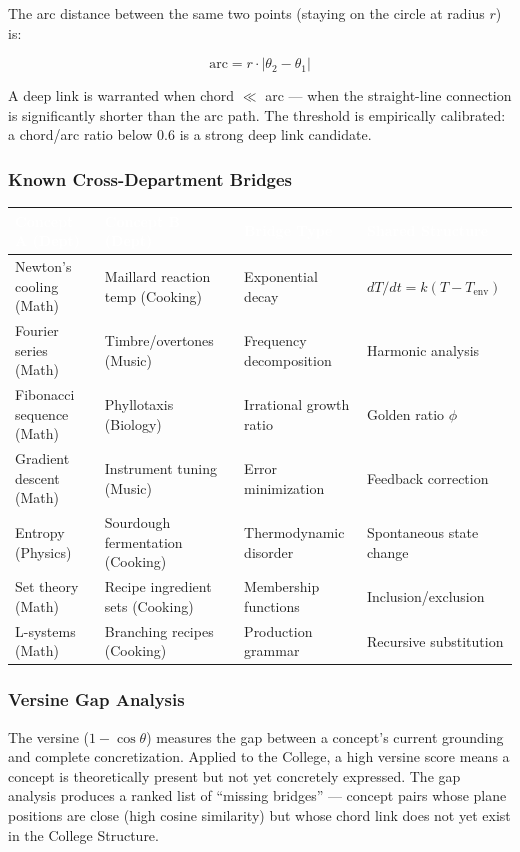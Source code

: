 \documentclass[11pt,letterpaper]{article}
\newcommand{\tableheader}[1]{\textbf{\sffamily\textcolor{white}{#1}}}
\begin{document}
The arc distance between the same two points (staying on the circle at radius $r$) is:

\[
  \text{arc} = r \cdot |\theta_2 - \theta_1|
\]

A deep link is warranted when chord $\ll$ arc --- when the straight-line connection is significantly
shorter than the arc path. The threshold is empirically calibrated: a chord/arc ratio below $0.6$
is a strong deep link candidate.

\subsubsection{Known Cross-Department Bridges}

\begin{center}
\begin{tabularx}{\textwidth}{L{3.5cm}L{3.5cm}L{2.5cm}X}
\toprule
{}
\tableheader{Concept A (Dept)} & \tableheader{Concept B (Dept)} & \tableheader{Bridge Type} & \tableheader{Shared Structure} \\
\midrule
Newton's cooling (Math) & Maillard reaction temp (Cooking) & Exponential decay & $dT/dt = k(T - T_\text{env})$ \\
Fourier series (Math) & Timbre/overtones (Music) & Frequency decomposition & Harmonic analysis \\
Fibonacci sequence (Math) & Phyllotaxis (Biology) & Irrational growth ratio & Golden ratio $\phi$ \\
Gradient descent (Math) & Instrument tuning (Music) & Error minimization & Feedback correction \\
Entropy (Physics) & Sourdough fermentation (Cooking) & Thermodynamic disorder & Spontaneous state change \\
Set theory (Math) & Recipe ingredient sets (Cooking) & Membership functions & Inclusion/exclusion \\
L-systems (Math) & Branching recipes (Cooking) & Production grammar & Recursive substitution \\
\bottomrule
\end{tabularx}
\end{center}

\subsubsection{Versine Gap Analysis}

The versine ($1 - \cos\theta$) measures the gap between a concept's current grounding and complete
concretization. Applied to the College, a high versine score means a concept is theoretically
present but not yet concretely expressed. The gap analysis produces a ranked list of ``missing
bridges'' --- concept pairs whose plane positions are close (high cosine similarity) but whose
chord link does not yet exist in the College Structure.
\end{document}
